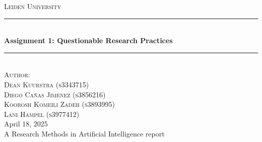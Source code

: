 \documentclass[12pt]{article}
\begin{document}

\begin{titlepage}

\newcommand{\HRule}{\rule{\linewidth}{0.5mm}}

\center
\begin{figure}[H]  \end{figure}
\textsc{\LARGE Leiden University}\\[1.5cm]


\HRule \\[0.4cm]
{ \huge \bfseries Assignment 1: Questionable Research Practices}\\[0.1cm] %
\HRule \\[1.5cm]

\textsc{Author:}\\[0.3cm]
\textsc{\Large Dean Kuurstra (s3343715)}\\[0.5cm]
\textsc{\Large Diego Cañas Jimenez (s3856216)}\\[0.5cm]
\textsc{\Large Koorosh Komeili Zadeh (s3893995)}\\[0.5cm]
\textsc{\Large Lani Hampel (s3977412)}\\[0.5cm]

\large April 18, 2025\\
A Research Methods in Artificial Intelligence report\\

\vfill %

\end{titlepage}

\newpage
\end{document}
